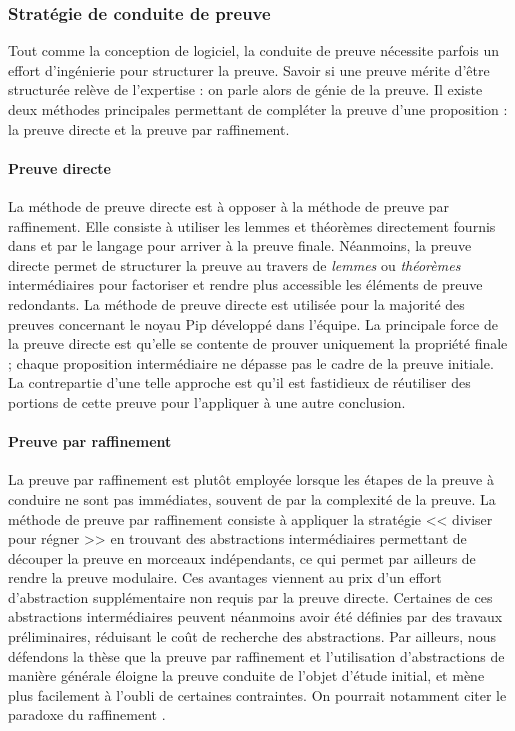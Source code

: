 			\subsubsection{Stratégie de conduite de preuve}
			Tout comme la conception de logiciel, la conduite de preuve nécessite parfois un effort d'ingénierie pour structurer la preuve. Savoir si une preuve mérite d'être structurée relève  de l'expertise : on parle alors de génie de la preuve. Il existe deux méthodes principales permettant de compléter la preuve d'une proposition : la preuve directe et la preuve par raffinement.

			\paragraph{Preuve directe} La méthode de preuve directe est à opposer à la méthode de preuve par raffinement. Elle consiste à utiliser les lemmes et théorèmes directement fournis dans et par le langage pour arriver à la preuve finale. Néanmoins, la preuve directe permet de structurer la preuve au travers de \emph{lemmes} ou \emph{théorèmes} intermédiaires pour factoriser et rendre plus accessible les éléments de preuve redondants. La méthode de preuve directe est utilisée pour la majorité des preuves concernant le noyau Pip développé dans l'équipe. La principale force de la preuve directe est qu'elle se contente de prouver uniquement la propriété finale ; chaque proposition intermédiaire ne dépasse pas le cadre de la preuve initiale. La contrepartie d'une telle approche est qu'il est fastidieux de réutiliser des portions de cette preuve pour l'appliquer à une autre conclusion.
			
			\paragraph{Preuve par raffinement} La preuve par raffinement \cite{refinement} est plutôt employée lorsque les étapes de la preuve à conduire ne sont pas immédiates, souvent de par la complexité de la preuve. La méthode de preuve par raffinement consiste à appliquer la stratégie << diviser pour régner >> en trouvant des abstractions intermédiaires permettant de découper la preuve en morceaux indépendants, ce qui permet par ailleurs de rendre la preuve modulaire. Ces avantages viennent au prix d'un effort d'abstraction supplémentaire non requis par la preuve directe. Certaines de ces abstractions intermédiaires peuvent néanmoins avoir été définies par des travaux préliminaires, réduisant le coût de recherche des abstractions. Par ailleurs, nous défendons la thèse que la preuve par raffinement et l'utilisation d'abstractions de manière générale éloigne la preuve conduite de l'objet d'étude initial, et mène plus facilement à l'oubli de certaines contraintes. On pourrait notamment citer le paradoxe du raffinement \cite{refinementparadox, refinementparadoxsolution}.

